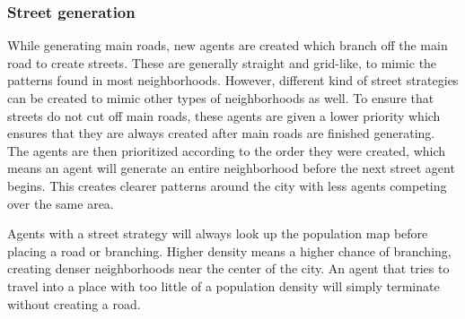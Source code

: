 \subsubsection{Street generation}
While generating main roads, new agents are created which branch off the main road to create streets.
These are generally straight and grid-like, to mimic the patterns found in most neighborhoods.
However, different kind of street strategies can be created to mimic other types of neighborhoods as well.
To ensure that streets do not cut off main roads, these agents are given a lower priority which ensures that they are always created after main roads are finished generating.
The agents are then prioritized according to the order they were created, which means an agent will generate an entire neighborhood before the next street agent begins.
This creates clearer patterns around the city with less agents competing over the same area.

Agents with a street strategy will always look up the population map before placing a road or branching.
Higher density means a higher chance of branching, creating denser neighborhoods near the center of the city.
An agent that tries to travel into a place with too little of a population density will simply terminate without creating a road. 
